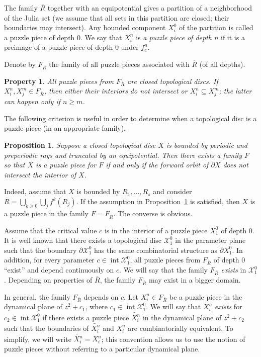 \documentclass[12pt,a4paper]{amsart}
\newtheorem{property}[theorem]{Property}
\newtheorem{proposition}[theorem]{Proposition}
\newcommand{\XX}{\mathcal X}
\newcommand{\ovl}{\overline}
\newcommand{\intr}{\operatorname{int}}
\begin{document}
The family $\ovl R$ together with an equipotential gives a
partition of a neighborhood of the Julia set (we assume that all sets in
this partition are closed; their boundaries may intersect).
Any bounded
component $X^0_i$ of the partition is called a puzzle piece of depth
$0$. We say that $X^n_i$ is \textit{a puzzle piece of depth $n$} if
it is a preimage of a puzzle piece of depth $0$ under $f^n_c$.

Denote by $F_{\ovl R}$ the family of all puzzle pieces
associated with $\ovl R$ (of all depths).
\begin{property}
All puzzle pieces from $F_{\ovl R}$ are closed topological discs. If
$X^n_i, X^m_j\in F_{\ovl R}$, then either their interiors do not
intersect or $X^n_i\subseteq X^m_j$; the latter can happen only if
$n\ge m$.
\end{property}

   The following criterion is useful in order
   to determine when a topological disc is a puzzle piece (in an
appropriate family).


\begin{proposition}
\label{prop0.1}
   Suppose a closed topological disc $X$ is bounded by periodic and preperiodic
   rays and truncated by an equipotential. Then there exists a family
$F$ so that $X$ is a puzzle piece for $F$
   if and only if the forward orbit of $\partial X$ does not
   intersect the interior of $X$.
\end{proposition}


Indeed, assume that $X$ is bounded by $R_1, \ldots, R_s$ and
consider $\ovl R=\bigcup_{k\ge 0}\bigcup_j f^k(R_j)$. If the
assumption in Proposition~\ref{prop0.1} is satisfied, then $X$ is a
puzzle piece in the family $F=F_{\ovl R}$. The converse is obvious.


Assume that the critical value $c$ is in the interior of a puzzle
piece $X^0_1$ of depth $0$. It is well known that there exists a
topological disc $\XX^0_1$ in the parameter plane such that the
boundary $\partial \XX^0_1$ has the same combinatorial structure as
$\partial X^0_1$. In addition, for every parameter $c\in \intr
\XX^0_1$, all puzzle pieces from $F_{\ovl R}$ of depth $0$ ``exist''
and depend continuously on $c$. We will say that the family $F_{\ovl
R}$ \textit{exists} in $\XX^0_1$. Depending on properties of $\ovl
R$, the family $F_{\ovl R}$ may exist in a bigger domain.

In general, the family $F_{\ovl R}$ depends on $c$. Let
$X^n_i\in F_{\ovl R}$ be a puzzle piece in the dynamical plane
of $z^2+c_1$, where $c_1\in \intr \XX^0_1$. We will say that
$X^n_i$ \textit{exists} for $c_2\in \intr \XX^0_1$ if there
exists a puzzle piece $\widetilde{X^n_i}$ in the dynamical plane of
$z^2+c_2$ such that the boundaries of $\widetilde{X^n_i}$ and
$X^n_i$ are combinatorially equivalent. To simplify, we will write
$\widetilde{X^n_i}=X^n_i$; this convention allows us to use the
notion of puzzle pieces without referring to a particular dynamical
plane.
\end{document}
